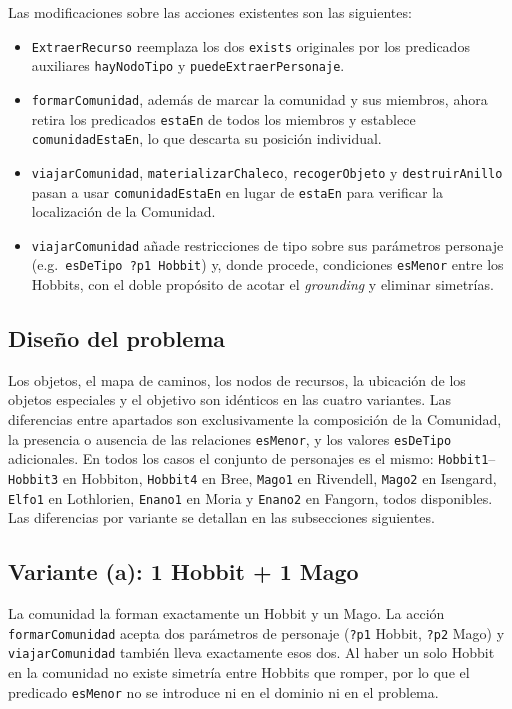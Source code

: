\documentclass[10pt]{article}
\begin{document}
Las modificaciones sobre las acciones existentes son las siguientes:
\begin{itemize}[label=-]
    \item \texttt{ExtraerRecurso} reemplaza los dos \texttt{exists} originales por los predicados auxiliares \texttt{hayNodoTipo} y \texttt{puedeExtraerPersonaje}.
    \item \texttt{formarComunidad}, además de marcar la comunidad y sus miembros, ahora retira los predicados \texttt{estaEn} de todos los miembros y establece \texttt{comunidadEstaEn}, lo que descarta su posición individual.
    \item \texttt{viajarComunidad}, \texttt{materializarChaleco}, \texttt{recogerObjeto} y \texttt{destruirAnillo} pasan a usar \texttt{comunidadEstaEn} en lugar de \texttt{estaEn} para verificar la localización de la Comunidad.
    \item \texttt{viajarComunidad} añade restricciones de tipo sobre sus parámetros personaje (e.g.\ \texttt{esDeTipo ?p1 Hobbit}) y, donde procede, condiciones \texttt{esMenor} entre los Hobbits, con el doble propósito de acotar el \textit{grounding} y eliminar simetrías.
\end{itemize}

\subsection{Diseño del problema}

Los objetos, el mapa de caminos, los nodos de recursos, la ubicación de los objetos especiales y el objetivo son idénticos en las cuatro variantes. Las diferencias entre apartados son exclusivamente la composición de la Comunidad, la presencia o ausencia de las relaciones \texttt{esMenor}, y los valores \texttt{esDeTipo} adicionales. En todos los casos el conjunto de personajes es el mismo: \texttt{Hobbit1}--\texttt{Hobbit3} en Hobbiton, \texttt{Hobbit4} en Bree, \texttt{Mago1} en Rivendell, \texttt{Mago2} en Isengard, \texttt{Elfo1} en Lothlorien, \texttt{Enano1} en Moria y \texttt{Enano2} en Fangorn, todos disponibles. Las diferencias por variante se detallan en las subsecciones siguientes.

\subsection{Variante (a): 1 Hobbit + 1 Mago}

La comunidad la forman exactamente un Hobbit y un Mago. La acción \texttt{formarComunidad} acepta dos parámetros de personaje (\texttt{?p1} Hobbit, \texttt{?p2} Mago) y \texttt{viajarComunidad} también lleva exactamente esos dos. Al haber un solo Hobbit en la comunidad no existe simetría entre Hobbits que romper, por lo que el predicado \texttt{esMenor} no se introduce ni en el dominio ni en el problema.
\end{document}
